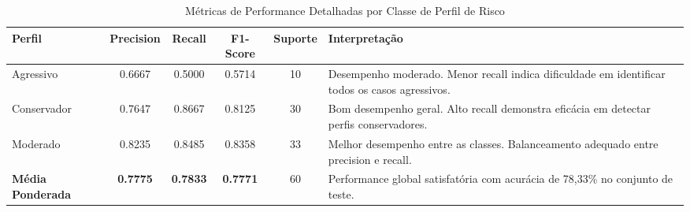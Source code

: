 \begin{table}[htbp]
\centering
\caption{Métricas de Performance Detalhadas por Classe de Perfil de Risco}
\label{tab:metricas_por_classe}
\small
\begin{tabular}{lccccp{5.5cm}}
\toprule
\textbf{Perfil} & \textbf{Precision} & \textbf{Recall} & \textbf{F1-Score} & \textbf{Suporte} & \textbf{Interpretação} \\
\midrule
Agressivo & 0.6667 & 0.5000 & 0.5714 & 10 & Desempenho moderado. Menor recall indica dificuldade em identificar todos os casos agressivos. \\
\addlinespace
Conservador & 0.7647 & 0.8667 & 0.8125 & 30 & Bom desempenho geral. Alto recall demonstra eficácia em detectar perfis conservadores. \\
\addlinespace
Moderado & 0.8235 & 0.8485 & 0.8358 & 33 & Melhor desempenho entre as classes. Balanceamento adequado entre precision e recall. \\
\midrule
\textbf{Média Ponderada} & \textbf{0.7775} & \textbf{0.7833} & \textbf{0.7771} & 60 & Performance global satisfatória com acurácia de 78,33\% no conjunto de teste. \\
\bottomrule
\end{tabular}
\end{table}